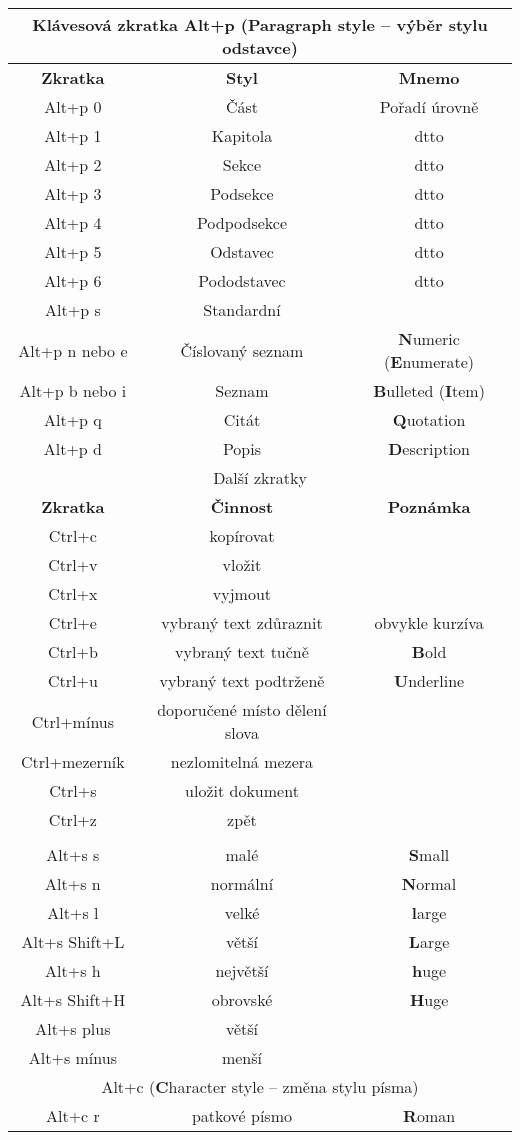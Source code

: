 \begin{flushleft}
\begin{longtable}{|c|c|c|}
\hline 
\multicolumn{3}{|c|}{\textsf{Klávesová zkratka Alt+p (}\textsf{\textbf{P}}\textsf{aragraph
style -- výběr stylu odstavce)}}\tabularnewline
\hline
\hline 
\textsf{\textbf{Zkratka}} & \textsf{\textbf{Styl}} & \textsf{\textbf{Mnemo}}\tabularnewline
\hline
\hline 
Alt+p 0 & Část & Pořadí úrovně\tabularnewline
\hline 
Alt+p 1 & Kapitola & dtto\tabularnewline
\hline 
Alt+p 2 & Sekce & dtto\tabularnewline
\hline 
Alt+p 3 & Podsekce & dtto\tabularnewline
\hline 
Alt+p 4 & Podpodsekce & dtto\tabularnewline
\hline 
Alt+p 5 & Odstavec & dtto\tabularnewline
\hline 
Alt+p 6 & Pododstavec & dtto\tabularnewline
\hline 
Alt+p s & Standardní & \tabularnewline
\hline 
Alt+p n nebo e & Číslovaný seznam & \textbf{N}umeric (\textbf{E}numerate)\tabularnewline
\hline 
Alt+p b nebo i & Seznam & \textbf{B}ulleted (\textbf{I}tem)\tabularnewline
\hline 
Alt+p q & Citát & \textbf{Q}uotation\tabularnewline
\hline 
Alt+p d & Popis & \textbf{D}escription\tabularnewline
\hline
\hline 
\multicolumn{3}{|c|}{\textsf{Další zkratky}}\tabularnewline
\hline
\hline 
\textsf{\textbf{Zkratka}} & \textsf{\textbf{Činnost}} & \textsf{\textbf{Poznámka}}\tabularnewline
\hline
\hline 
Ctrl+c & kopírovat & \tabularnewline
\hline 
Ctrl+v & vložit & \tabularnewline
\hline 
Ctrl+x & vyjmout & \tabularnewline
\hline 
Ctrl+e & vybraný text zdůraznit  & obvykle kurzíva\tabularnewline
\hline 
Ctrl+b & vybraný text tučně & \textbf{B}old\tabularnewline
\hline 
Ctrl+u & vybraný text podtrženě & \textbf{U}nderline\tabularnewline
\hline 
Ctrl+mínus & doporučené místo dělení slova & \tabularnewline
\hline 
Ctrl+mezerník & nezlomitelná mezera & \tabularnewline
\hline 
Ctrl+s & uložit dokument & \tabularnewline
\hline 
Ctrl+z & zpět & \tabularnewline
\hline
\newpage
\hline 
\multicolumn{3}{|c|}{\textsf{Alt+s (Font }\textsf{\textbf{s}}\textsf{ize -- změna velikosti
písma)}}\tabularnewline
\hline
\hline 
Alt+s s & malé & \textbf{S}mall\tabularnewline
\hline 
Alt+s n & normální & \textbf{N}ormal\tabularnewline
\hline 
Alt+s l & velké & \textbf{l}arge\tabularnewline
\hline 
Alt+s Shift+L & větší & \textbf{L}arge\tabularnewline
\hline 
Alt+s h & největší & \textbf{h}uge\tabularnewline
\hline 
Alt+s Shift+H & obrovské & \textbf{H}uge\tabularnewline
\hline 
Alt+s plus & větší  & \tabularnewline
\hline 
Alt+s mínus  & menší & \tabularnewline
\hline
\hline 
\multicolumn{3}{|c|}{\textsf{Alt+c (}\textsf{\textbf{C}}\textsf{haracter style -- změna
stylu písma)}}\tabularnewline
\hline
\hline 
Alt+c r & patkové písmo & \textbf{R}oman\tabularnewline

\end{longtable}
\end{flushleft}
